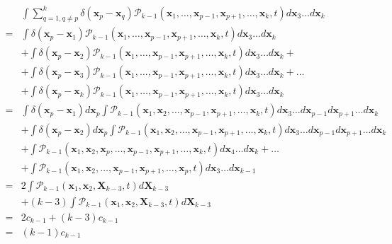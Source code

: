 \begin{subequations} 
\begin{flalign}
 & \int\sum_{q=1,q\neq p}^{k}\delta({\boldsymbol{x}_p-\boldsymbol{x}_q})\mathcal{P}_{k-1}(\boldsymbol{x}_{1},\ldots,\boldsymbol{x}_{p-1},\boldsymbol{x}_{p+1},\ldots,\boldsymbol{x}_{k},t)d\boldsymbol{x}_{3}\ldots d\boldsymbol{x}_{k}\\
= & \int\delta(\boldsymbol{x}_{p}-\boldsymbol{x}_{1})\mathcal{P}_{k-1}(\boldsymbol{x}_{1},\ldots,\boldsymbol{x}_{p-1},\boldsymbol{x}_{p+1},\ldots,\boldsymbol{x}_{k},t)d\boldsymbol{x}_{3}\ldots d\boldsymbol{x}_{k}\\
 & +\int\delta(\boldsymbol{x}_{p}-\boldsymbol{x}_{2})\mathcal{P}_{k-1}(\boldsymbol{x}_{1},\ldots,\boldsymbol{x}_{p-1},\boldsymbol{x}_{p+1},\ldots,\boldsymbol{x}_{k},t)d\boldsymbol{x}_{3}\ldots d\boldsymbol{x}_{k}+\\
 & + \int\delta({\boldsymbol{x}_p-\boldsymbol{x}_3})\mathcal{P}_{k-1}(\boldsymbol{x}_{1},\ldots,\boldsymbol{x}_{p-1},\boldsymbol{x}_{p+1},\ldots,\boldsymbol{x}_{k},t)d\boldsymbol{x}_{3}\ldots d\boldsymbol{x}_{k} + \ldots\\
 &+  \int\delta({\boldsymbol{x}_p-\boldsymbol{x}_k})\mathcal{P}_{k-1}(\boldsymbol{x}_{1},\ldots,\boldsymbol{x}_{p-1},\boldsymbol{x}_{p+1},\ldots,\boldsymbol{x}_{k},t)d\boldsymbol{x}_{3}\ldots d\boldsymbol{x}_{k}\\
= & \int\delta(\boldsymbol{x}_{p}-\boldsymbol{x}_{1})d\boldsymbol{x}_{p}\int\mathcal{P}_{k-1}(\boldsymbol{x}_{1},\boldsymbol{x}_{2},\ldots,\boldsymbol{x}_{p-1},\boldsymbol{x}_{p+1},\ldots,\boldsymbol{x}_{k},t)d\boldsymbol{x}_{3}\ldots d\boldsymbol{x}_{p-1}d\boldsymbol{x}_{p+1}\ldots d\boldsymbol{x}_{k}\\
 & +\int\delta(\boldsymbol{x}_{p}-\boldsymbol{x}_{2})d\boldsymbol{x}_{p}\int\mathcal{P}_{k-1}(\boldsymbol{x}_{1},\boldsymbol{x}_{2},\ldots,\boldsymbol{x}_{p-1},\boldsymbol{x}_{p+1},\ldots,\boldsymbol{x}_{k},t)d\boldsymbol{x}_{3}\ldots d\boldsymbol{x}_{p-1}d\boldsymbol{x}_{p+1}\ldots d\boldsymbol{x}_{k}\\
 & + \int\mathcal{P}_{k-1}(\boldsymbol{x}_{1},\boldsymbol{x}_{2},\boldsymbol{x}_{p},\ldots,\boldsymbol{x}_{p-1},\boldsymbol{x}_{p+1},\ldots,\boldsymbol{x}_{k},t)d\boldsymbol{x}_{4}\ldots d\boldsymbol{x}_{k} + \ldots\\
 &+  \int\mathcal{P}_{k-1}(\boldsymbol{x}_{1},\boldsymbol{x}_{2},\ldots,\boldsymbol{x}_{p-1},\boldsymbol{x}_{p+1},\ldots,\boldsymbol{x}_{p},t)d\boldsymbol{x}_{3}\ldots d\boldsymbol{x}_{k-1}\\
= & 2\int\mathcal{P}_{k-1}(\boldsymbol{x}_{1},\boldsymbol{x}_{2},\boldsymbol{X}_{k-3},t)d\boldsymbol{X}_{k-3}\\
 & +(k-3)\int\mathcal{P}_{k-1}(\boldsymbol{x}_{1},\boldsymbol{x}_{2},\boldsymbol{X}_{k-3},t)d\boldsymbol{X}_{k-3}\label{eq:birth_term_pgeq3_part2}\\
= & 2c_{k-1}+(k-3)c_{k-1}\\
= & (k-1)c_{k-1}
\end{flalign}
\end{subequations}

